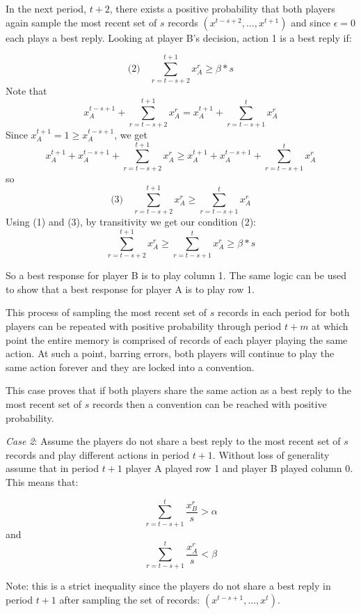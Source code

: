 \documentclass{article}
\begin{document}
\vskip12pt

In the next period, $t+2$, there exists a positive probability that both players again sample the most recent set of $s$ records $(x^{t-s+2},...,x^{t+1})$ and since $\epsilon=0$ each plays a best reply. Looking at player B's decision, action 1 is a best reply if:

$$\text{(2)} \hspace{12pt} \sum\limits_{r=t-s+2}^{t+1} x^r_A \geq \beta*s$$
Note that
$$x^{t-s+1}_A+\sum\limits_{r=t-s+2}^{t+1} x^r_A = x^{t+1}_A+\sum\limits_{r=t-s+1}^t x^r_A$$
Since 
$x^{t+1}_A = 1 \geq x^{t-s+1}_A$, we get
$$x^{t+1}_A+x^{t-s+1}_A+\sum\limits_{r=t-s+2}^{t+1} x^r_A \geq x^{t+1}_A+x^{t-s+1}_A+\sum\limits_{r=t-s+1}^t x^r_A$$
so
$$\text{(3)} \hspace{12pt} \sum\limits_{r=t-s+2}^{t+1} x^r_A \geq \sum\limits_{r=t-s+1}^t x^r_A $$
Using (1) and (3), by transitivity we get our condition (2):
$$\sum\limits_{r=t-s+2}^{t+1} x^r_A \geq \sum\limits_{r=t-s+1}^t x^r_A \geq \beta*s$$

So a best response for player B is to play column 1. The same logic can be used to show that a best response for player A is to play row 1.

\vskip12pt

This process of sampling the most recent set of $s$ records in each period for both players can be repeated with positive probability through period $t+m$ at which point the entire memory is comprised of records of each player playing the same action. At such a point, barring errors, both players will continue to play the same action forever and they are locked into a convention.

\vskip12pt

This case proves that if both players share the same action as a best reply to the most recent set of $s$ records then a convention can be reached with positive probability.

\vskip24pt

\textit{Case 2}: Assume the players do not share a best reply to the most recent set of $s$ records and play different actions in period $t+1$. Without loss of generality assume that in period $t+1$ player A played row 1 and player B played column 0. This means that:

$$\sum\limits_{r=t-s+1}^{t} \frac{x^r_B}{s} > \alpha$$
and
$$\sum\limits_{r=t-s+1}^{t} \frac{x^r_A}{s} < \beta$$

Note: this is a strict inequality since the players do not share a best reply in period $t+1$ after sampling the set of records: $(x^{t-s+1},...,x^{t})$.
\end{document}
